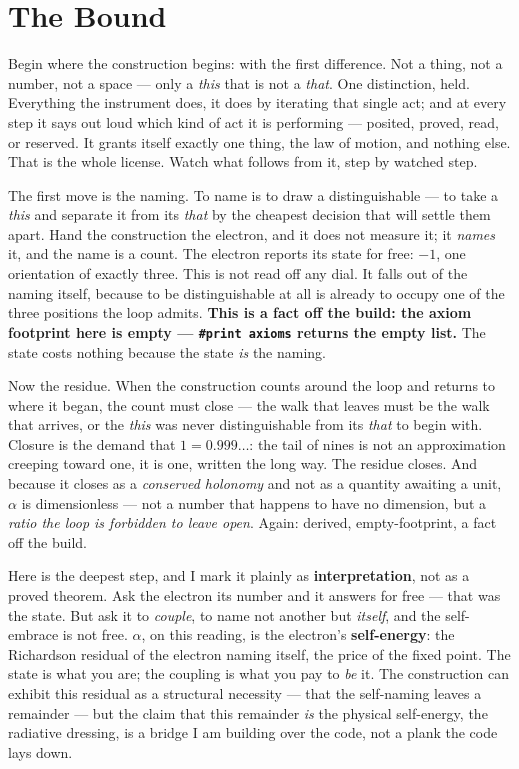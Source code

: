 \chapter{The Bound}

Begin where the construction begins: with the first difference. Not a thing, not a number, not a space --- only
a \emph{this} that is not a \emph{that}. One distinction, held. Everything the instrument does, it does by iterating
that single act; and at every step it says out loud which kind of act it is performing --- posited, proved, read, or
reserved. It grants itself exactly one thing, the law of motion, and nothing else. That is the whole license. Watch
what follows from it, step by watched step.

The first move is the naming. To name is to draw a distinguishable --- to take a \emph{this} and separate it from
its \emph{that} by the cheapest decision that will settle them apart. Hand the construction the electron, and it does
not measure it; it \emph{names} it, and the name is a count. The electron reports its state for free: \(-1\), one
orientation of exactly three. This is not read off any dial. It falls out of the naming itself, because to be
distinguishable at all is already to occupy one of the three positions the loop admits. \textbf{This is a fact off the
build: the axiom footprint here is empty --- \texttt{\#print axioms} returns the empty list.} The state costs nothing
because the state \emph{is} the naming.

Now the residue. When the construction counts around the loop and returns to where it began, the count must close
--- the walk that leaves must be the walk that arrives, or the \emph{this} was never distinguishable from its
\emph{that} to begin with. Closure is the demand that \(1 = 0.999\ldots\): the tail of nines is not an approximation
creeping toward one, it is one, written the long way. The residue closes. And because it closes as a \emph{conserved
holonomy} and not as a quantity awaiting a unit, \(\alpha\) is dimensionless --- not a number that happens to have no
dimension, but a \emph{ratio the loop is forbidden to leave open}. Again: derived, empty-footprint, a fact off the
build.

Here is the deepest step, and I mark it plainly as \textbf{interpretation}, not as a proved theorem. Ask the electron
its number and it answers for free --- that was the state. But ask it to \emph{couple}, to name not another but
\emph{itself}, and the self-embrace is not free. \(\alpha\), on this reading, is the electron's \textbf{self-energy}:
the Richardson residual of the electron naming itself, the price of the fixed point. The state is what you are; the
coupling is what you pay to \emph{be} it. The construction can exhibit this residual as a structural necessity ---
that the self-naming leaves a remainder --- but the claim that this remainder \emph{is} the physical self-energy, the
radiative dressing, is a bridge I am building over the code, not a plank the code lays down.

